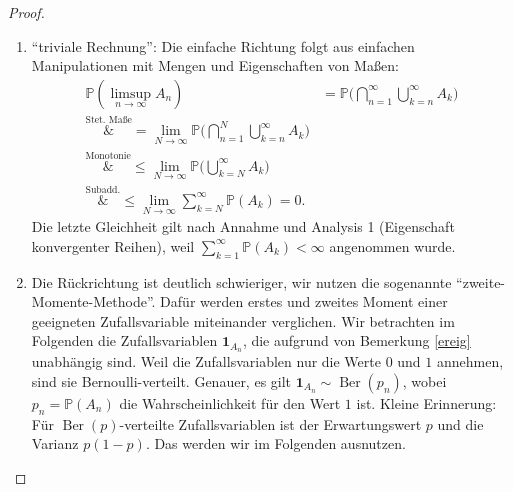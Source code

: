 \begin{proof}\abs
	\begin{enumerate}[label=(\roman*)]
		\item \enquote{triviale Rechnung}: Die einfache Richtung folgt aus einfachen Manipulationen mit Mengen und Eigenschaften von Ma\ss en:
		\begin{align*}
			\mathbb{P}(\limsup\limits_{n \to \infty} A_n) 
			&= \mathbb{P}\Big(\bigcap_{n=1}^{\infty} \bigcup_{k=n}^{\infty} A_k\Big)\\
			\overset{\text{Stet. Ma\ss e}}&{=}\lim\limits_{N \to \infty} \mathbb{P}\Big(\bigcap_{n=1}^{N} \bigcup_{k=n}^{\infty} A_k\Big)\\
			\overset{\text{Monotonie}}&{\leq}\lim\limits_{N \to \infty} \mathbb{P}\Big(\bigcup_{k=N}^{\infty} A_k\Big) \\
			\overset{\text{Subadd.}}&{\leq} \lim\limits_{N \to \infty} \sum\limits_{k=N}^{\infty} \mathbb{P}(A_k) = 0.
		\end{align*}
		Die letzte Gleichheit gilt nach Annahme und Analysis 1 (Eigenschaft konvergenter Reihen), weil $\sum_{k=1}^\infty \mathbb P(A_k)<\infty$ angenommen wurde.
		\item Die R\"uckrichtung ist deutlich schwieriger, wir nutzen die sogenannte \enquote{zweite-Momente-Methode}. Daf\"ur werden erstes und zweites Moment einer geeigneten Zufallsvariable miteinander verglichen. Wir betrachten im Folgenden die Zufallsvariablen $\mathbf 1_{A_n}$, die aufgrund von Bemerkung \ref{ereig} unabh\"angig sind. Weil die Zufallsvariablen nur die Werte $0$ und $1$ annehmen, sind sie Bernoulli-verteilt. Genauer, es gilt $\mathbf 1_{A_n}\sim \operatorname{Ber}(p_n)$, wobei $p_n=\mathbb P(A_n)$ die Wahrscheinlichkeit f\"ur den Wert $1$ ist. Kleine Erinnerung: F\"ur $\operatorname{Ber}(p)$-verteilte Zufallsvariablen ist der Erwartungswert $p$ und die Varianz $p(1-p)$. Das werden wir im Folgenden ausnutzen.\smallskip
		

\end{enumerate}
\end{proof}
